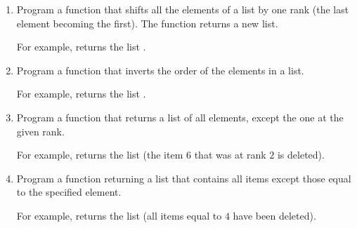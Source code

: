 \documentclass[11pt,class=report,crop=false]{standalone}
\begin{document}
\begin{activite}


\begin{enumerate}
  \item Program a function  that shifts all the elements of a list by one rank (the last element becoming the first). The function returns a new list.
  
  For example,  returns the list \ci{[4,1,2,3]}.
  
  \item Program a function  that inverts the order of the elements in a list. 
  
  For example,  returns the list \ci{[4,3,2,1]}.
  
  \item Program a function  that returns a list of all elements, except the one at the given rank. 
  
  For example,  returns the list \ci{[8,7,5,4]} (the item $6$ that was at rank $2$ is deleted).
  
    \item Program a function  returning a list that contains all items except those equal to the specified element. 
    
 For example,  returns the list \ci{[8,7,6,5]} (all items equal to $4$ have been deleted).
    
\end{enumerate}

\end{activite}
\end{document}
